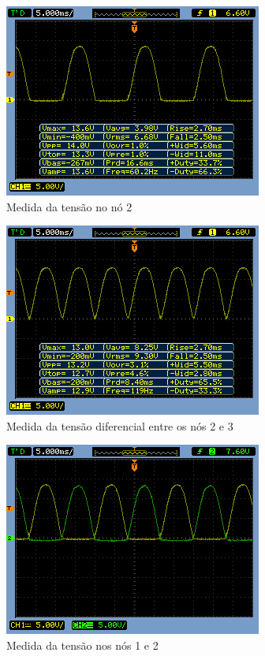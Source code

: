 \documentclass[a4paper]{article} %
\begin{document}
\newpage
\begin{figure}[h!]
\begin{centering}
\includegraphics[scale=0.7]{Imagens/3.3.1onda_completa/no2} \caption{Medida da tensão no nó 2  \label{fig:q2-no2}}
\par\end{centering}
\end{figure}


\begin{figure}[h!]
\begin{centering}
\includegraphics[scale=0.7]{Imagens/3.3.1onda_completa/no3} \caption{Medida da tensão diferencial entre os nós 2 e 3 \label{fig:Fig-45}}
\par\end{centering}
\end{figure}


\begin{figure}[h!]
\begin{centering}
\includegraphics[scale=0.7]{Imagens/3.3.1onda_completa/no12} \caption{Medida da tensão nos nós 1 e 2 \label{fig:Fig-45}}
\par\end{centering}
\end{figure}
\end{document}
